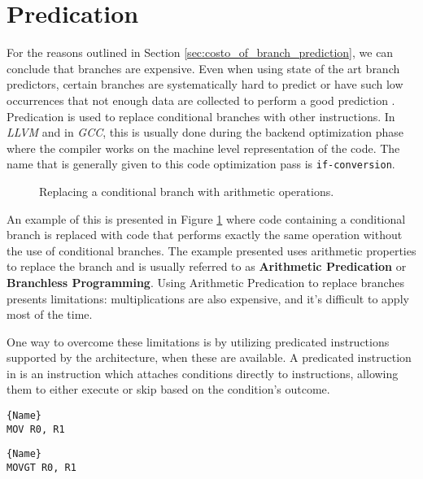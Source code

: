 \section{Predication}
\label{sec:predication}

For the reasons outlined in Section \ref{sec:costo_of_branch_prediction}, we can conclude that branches are expensive. Even when using state of the art branch predictors, certain branches are systematically hard to predict or have such low occurrences that not enough data are collected to perform a good prediction \cite{lin2019branch}. 
Predication is used to replace conditional branches with other instructions. In \textit{LLVM} and in \textit{GCC}, this is usually done during the backend optimization phase where the compiler works on the machine level representation of the code. The name that is generally given to this code optimization pass is \texttt{if-conversion}.

\begin{figure}[h!]
\centering

\caption{Replacing a conditional branch with arithmetic operations.}
\label{fig:branching_predication_example}
\end{figure}

An example of this is presented in Figure \ref{fig:branching_predication_example} where code containing a conditional branch is replaced with code that performs exactly the same operation without the use of conditional branches. The example presented uses arithmetic properties to replace the branch and is usually referred to as \textbf{Arithmetic Predication} or \textbf{Branchless Programming}. Using Arithmetic Predication to replace branches presents limitations: multiplications are also expensive, and it's difficult to apply most of the time.

One way to overcome these limitations is by utilizing predicated instructions supported by the architecture, when these are available.
A predicated instruction in \armvs is an instruction which attaches conditions directly to instructions, allowing them to either execute or skip based on the condition's outcome.

\noindent\begin{minipage}{.45\textwidth}
\begin{lstlisting}[caption=Standard MOV in ARMv7 assembly, style=AsmStyle]{Name}
MOV R0, R1
\end{lstlisting}
\label{lst:add}
\end{minipage}\hfill
\begin{minipage}{.45\textwidth}
\begin{lstlisting}[caption=Predicated MOV in ARMv7 assembly,style=AsmStyle]{Name}
MOVGT R0, R1
\end{lstlisting}
\label{lst:cadd}
\end{minipage}

